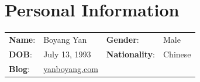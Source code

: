 \documentclass[]{friggeri-cv}
\begin{document}

\section{Personal Information}
\begin{tabular}{p{3cm} p{3cm} p{3cm} p{3cm} }
  \textbf{Name}: & Boyang Yan & \textbf{Gender}: & Male \\
  \textbf{DOB}:  & July 13, 1993  &  \textbf{Nationality}: & Chinese \\
  \textbf{Blog}:  & \href{http://www.yanboyang.com}{yanboyang.com} &  & \\
\end{tabular}

\end{document}
